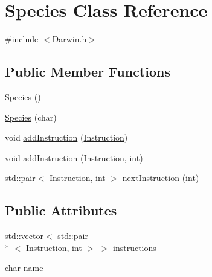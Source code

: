 \hypertarget{classSpecies}{\section{Species Class Reference}
\label{classSpecies}
}


{\ttfamily \#include $<$Darwin.\-h$>$}

\subsection*{Public Member Functions}
\begin{DoxyCompactItemize}
\item 
\hyperlink{classSpecies_abb0f8e3208b0cc676157b7dff837c0be}{Species} ()
\item 
\hyperlink{classSpecies_ace6b474ced2cdf2b61573098624160d3}{Species} (char)
\item 
void \hyperlink{classSpecies_a31ee34a39d46d237e33e9ad4b221bd8d}{add\-Instruction} (\hyperlink{Darwin_8h_acbd603b5f7c788a74eade8d4837ba684}{Instruction})
\item 
void \hyperlink{classSpecies_a7c837eae608ea8f6c611f6a376d93722}{add\-Instruction} (\hyperlink{Darwin_8h_acbd603b5f7c788a74eade8d4837ba684}{Instruction}, int)
\item 
std\-::pair$<$ \hyperlink{Darwin_8h_acbd603b5f7c788a74eade8d4837ba684}{Instruction}, int $>$ \hyperlink{classSpecies_a08cbb5e5155776c5931180d4f2f5732e}{next\-Instruction} (int)
\end{DoxyCompactItemize}
\subsection*{Public Attributes}
\begin{DoxyCompactItemize}
\item 
std\-::vector$<$ std\-::pair\\*
$<$ \hyperlink{Darwin_8h_acbd603b5f7c788a74eade8d4837ba684}{Instruction}, int $>$ $>$ \hyperlink{classSpecies_a362b2f3be5cfd3908e63a51f1224a70b}{instructions}
\item 
char \hyperlink{classSpecies_aafe22c0666abe0f9680cd21fea21e677}{name}
\end{DoxyCompactItemize}



